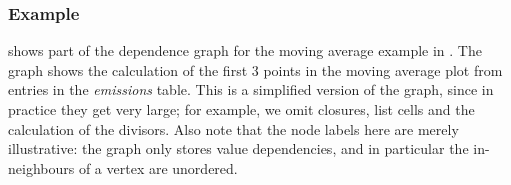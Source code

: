 

\subsubsection{Example}

 shows part of the dependence graph for the moving average example in
. The graph shows the calculation of the
first 3 points in the moving average plot from entries in the \emph{emissions} table. This is a simplified
version of the graph, since in practice they get very large; for example, we omit closures, list cells and the
calculation of the divisors. Also note that the node labels here are merely illustrative: the graph only
stores value dependencies, and in particular the in-neighbours of a vertex are unordered.


